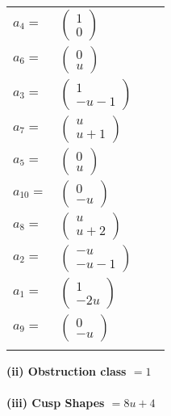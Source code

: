 \documentclass[1p]{elsarticle_modified}
\theoremstyle{definition}
\begin{document}
\begin{tabular}{m{7pt} m{180pt} m{7pt} m{180pt} }
\flushright $a_{4}=$&$\begin{pmatrix}1\\0\end{pmatrix}$ \\
\flushright $a_{6}=$&$\begin{pmatrix}0\\u\end{pmatrix}$ \\
\flushright $a_{3}=$&$\begin{pmatrix}1\\- u-1\end{pmatrix}$ \\
\flushright $a_{7}=$&$\begin{pmatrix}u\\u+1\end{pmatrix}$ \\
\flushright $a_{5}=$&$\begin{pmatrix}0\\u\end{pmatrix}$ \\
\flushright $a_{10}=$&$\begin{pmatrix}0\\- u\end{pmatrix}$ \\
\flushright $a_{8}=$&$\begin{pmatrix}u\\u+2\end{pmatrix}$ \\
\flushright $a_{2}=$&$\begin{pmatrix}- u\\- u-1\end{pmatrix}$ \\
\flushright $a_{1}=$&$\begin{pmatrix}1\\-2 u\end{pmatrix}$ \\
\flushright $a_{9}=$&$\begin{pmatrix}0\\- u\end{pmatrix}$\\&\end{tabular}
\flushleft \textbf{(ii) Obstruction class $= 1$}\\~\\
\flushleft \textbf{(iii) Cusp Shapes $= 8 u+4$}\\~\\
\end{document}

